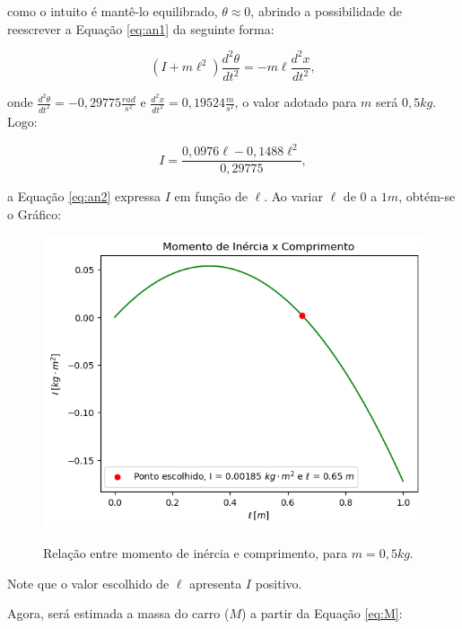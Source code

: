 \documentclass[12pt,           %
a4paper,                       %
openany,                       %
oneside,                       %
chapter=TITLE,                 %
english,                       %
spanish,                       %
brazil,                        %
sumario=tradicional]{abntex2}  %
\begin{document}
\begin{OnehalfSpace}
\noindent como o intuito é mantê-lo equilibrado, $\theta \approx 0$, abrindo a possibilidade de reescrever a Equação \ref{eq:an1} da seguinte forma:

\begin{equation}
    (I + m\ell^2)\frac{d^2\theta}{dt^2}   = - m\ell\frac{d^2x}{dt^2},
    \label{eq:an22}
\end{equation}

\noindent onde $\frac{d^2\theta}{dt^2} = -0,29775\frac{rad}{s^2}$ e $\frac{d^2x}{dt^2} = 0,19524\frac{m}{s^2}$, o valor adotado para $m$ será $0,5 kg$. Logo:

\begin{equation}
    I = \frac{0,0976\ell - 0,1488\ell^2}{0,29775},
    \label{eq:an2}
\end{equation}

\noindent a Equação \ref{eq:an2} expressa $I$ em função de $\ell$. Ao variar $\ell$ de $0$ a $1m$, obtém-se o Gráfico:

\begin{figure}[H]
     \centering
     \vspace*{-0.2cm}
     \caption{Relação entre momento de inércia e comprimento, para $m=0,5kg$.}
     \includegraphics[scale=.55]{Grafico2.png}
     \label{fcte}
\end{figure}
\vspace*{-.85cm}
{\raggedright {}}

Note que o valor escolhido de $\ell$ apresenta $I$ positivo.

Agora, será estimada a massa do carro (\(M\)) a partir da Equação \ref{eq:M}:


\end{OnehalfSpace}
\end{document}
